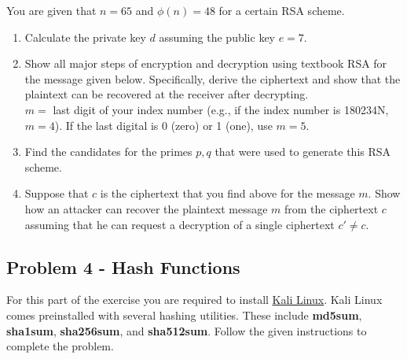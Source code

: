 \documentclass[11pt,letterpaper]{article}
\begin{document}
	You are given that $n=65$ and $\phi(n)=48$ for a certain RSA scheme.
	\begin{enumerate}
		\item Calculate the private key $d$ assuming the public key $e=7$.
		\item Show all major steps of encryption and decryption using textbook RSA for the message given below. Specifically, derive the ciphertext and show that the plaintext can be recovered at the receiver after decrypting.\\
		$m=$ last digit of your index number (e.g., if the index number is 180234N, $m=4$). If the last digital is 0 (zero) or 1 (one), use $m=5$. 
		\item Find the candidates for the primes $p,q$ that were used to generate this RSA scheme.
		\item Suppose that $c$ is the ciphertext that you find above for the message $m$. Show how an attacker can recover the plaintext message $m$ from the ciphertext $c$ assuming that he can request a decryption of a single ciphertext $c' \neq c$. 
	\end{enumerate}
	
	\subsection*{Problem 4 - Hash Functions}
	
	{For this part of the exercise you are required to install \href{https://www.kali.org/get-kali/#kali-platforms}{Kali Linux}. Kali Linux comes preinstalled with several hashing utilities. These include \textbf{md5sum}, \textbf{sha1sum},
		\textbf{sha256sum}, and \textbf{sha512sum}. Follow the given instructions to complete the problem.}
	
\end{document}
